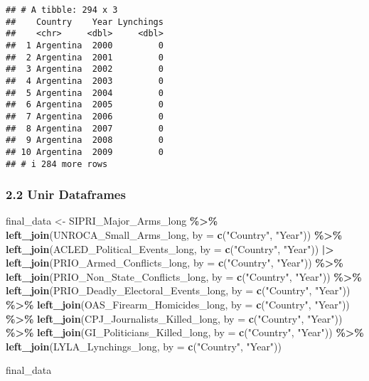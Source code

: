 \documentclass[
  11pt,
]{article}
\newenvironment{Shaded}{\begin{snugshade}}{\end{snugshade}}
\newcommand{\AttributeTok}[1]{\textcolor[rgb]{0.13,0.29,0.53}{#1}}
\newcommand{\FunctionTok}[1]{\textcolor[rgb]{0.13,0.29,0.53}{\textbf{#1}}}
\newcommand{\NormalTok}[1]{#1}
\newcommand{\OtherTok}[1]{\textcolor[rgb]{0.56,0.35,0.01}{#1}}
\newcommand{\SpecialCharTok}[1]{\textcolor[rgb]{0.81,0.36,0.00}{\textbf{#1}}}
\newcommand{\StringTok}[1]{\textcolor[rgb]{0.31,0.60,0.02}{#1}}
\begin{document}
\begin{verbatim}
## # A tibble: 294 x 3
##    Country    Year Lynchings
##    <chr>     <dbl>     <dbl>
##  1 Argentina  2000         0
##  2 Argentina  2001         0
##  3 Argentina  2002         0
##  4 Argentina  2003         0
##  5 Argentina  2004         0
##  6 Argentina  2005         0
##  7 Argentina  2006         0
##  8 Argentina  2007         0
##  9 Argentina  2008         0
## 10 Argentina  2009         0
## # i 284 more rows
\end{verbatim}

\subsubsection{2.2 Unir Dataframes}\label{unir-dataframes}

\begin{Shaded}
\begin{Highlighting}[]
\NormalTok{final\_data }\OtherTok{\textless{}{-}}\NormalTok{ SIPRI\_Major\_Arms\_long }\SpecialCharTok{\%\textgreater{}\%}
  \FunctionTok{left\_join}\NormalTok{(UNROCA\_Small\_Arms\_long, }\AttributeTok{by =} \FunctionTok{c}\NormalTok{(}\StringTok{"Country"}\NormalTok{, }\StringTok{"Year"}\NormalTok{)) }\SpecialCharTok{\%\textgreater{}\%}
  \FunctionTok{left\_join}\NormalTok{(ACLED\_Political\_Events\_long, }\AttributeTok{by =} \FunctionTok{c}\NormalTok{(}\StringTok{"Country"}\NormalTok{, }\StringTok{"Year"}\NormalTok{)) }\SpecialCharTok{|\textgreater{}}
  \FunctionTok{left\_join}\NormalTok{(PRIO\_Armed\_Conflicts\_long, }\AttributeTok{by =} \FunctionTok{c}\NormalTok{(}\StringTok{"Country"}\NormalTok{, }\StringTok{"Year"}\NormalTok{)) }\SpecialCharTok{\%\textgreater{}\%}
  \FunctionTok{left\_join}\NormalTok{(PRIO\_Non\_State\_Conflicts\_long, }\AttributeTok{by =} \FunctionTok{c}\NormalTok{(}\StringTok{"Country"}\NormalTok{, }\StringTok{"Year"}\NormalTok{)) }\SpecialCharTok{\%\textgreater{}\%}
  \FunctionTok{left\_join}\NormalTok{(PRIO\_Deadly\_Electoral\_Events\_long, }\AttributeTok{by =} \FunctionTok{c}\NormalTok{(}\StringTok{"Country"}\NormalTok{, }\StringTok{"Year"}\NormalTok{)) }\SpecialCharTok{\%\textgreater{}\%}
  \FunctionTok{left\_join}\NormalTok{(OAS\_Firearm\_Homicides\_long, }\AttributeTok{by =} \FunctionTok{c}\NormalTok{(}\StringTok{"Country"}\NormalTok{, }\StringTok{"Year"}\NormalTok{)) }\SpecialCharTok{\%\textgreater{}\%}
  \FunctionTok{left\_join}\NormalTok{(CPJ\_Journalists\_Killed\_long, }\AttributeTok{by =} \FunctionTok{c}\NormalTok{(}\StringTok{"Country"}\NormalTok{, }\StringTok{"Year"}\NormalTok{)) }\SpecialCharTok{\%\textgreater{}\%}
  \FunctionTok{left\_join}\NormalTok{(GI\_Politicians\_Killed\_long, }\AttributeTok{by =} \FunctionTok{c}\NormalTok{(}\StringTok{"Country"}\NormalTok{, }\StringTok{"Year"}\NormalTok{)) }\SpecialCharTok{\%\textgreater{}\%}
  \FunctionTok{left\_join}\NormalTok{(LYLA\_Lynchings\_long, }\AttributeTok{by =} \FunctionTok{c}\NormalTok{(}\StringTok{"Country"}\NormalTok{, }\StringTok{"Year"}\NormalTok{))}

\NormalTok{final\_data}
\end{Highlighting}
\end{Shaded}
\end{document}

